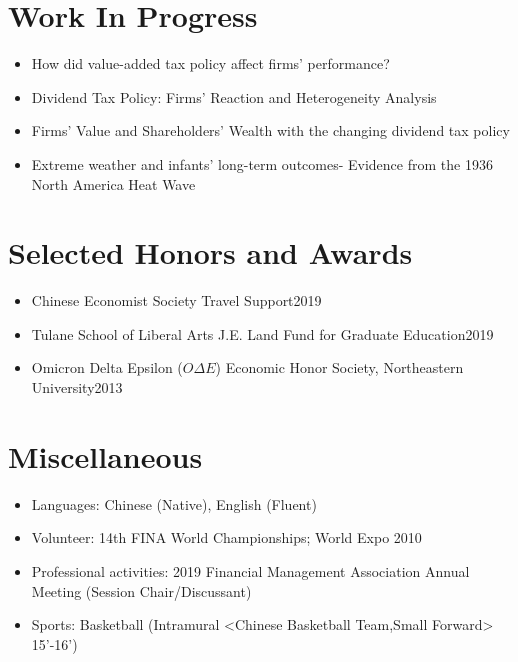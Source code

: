 \documentclass{resume}
\begin{document}
\section{Work In Progress}
\begin{itemize}[parsep=0.25ex]
  \item How did value-added tax policy affect firms' performance?
  \item Dividend Tax Policy: Firms' Reaction and Heterogeneity Analysis
  \item Firms' Value and Shareholders' Wealth with the changing dividend tax policy
  \item Extreme weather and infants' long-term outcomes- Evidence from the 1936 North America Heat Wave 
\end{itemize}

\section{Selected Honors and Awards}
\begin{itemize}[parsep=0.25ex]
  \item Chinese Economist Society Travel Support\hfill 2019
  \item Tulane School of Liberal Arts J.E. Land Fund for Graduate Education\hfill 2019
  \item Omicron Delta Epsilon ($O\Delta E$) Economic Honor Society, Northeastern University\hfill 2013
\end{itemize}

\section{Miscellaneous}
\begin{itemize}[parsep=0.25ex]
  \item Languages: 
  Chinese (Native), English (Fluent)
  
  \item Volunteer:
  14th FINA World Championships; World Expo 2010
  
  \item Professional activities:
  2019 Financial Management Association Annual Meeting (Session Chair/Discussant)
  
  \item Sports: 
  Basketball (Intramural <Chinese Basketball Team,Small Forward> 15'-16')

\end{itemize}

%
%
\end{document}

